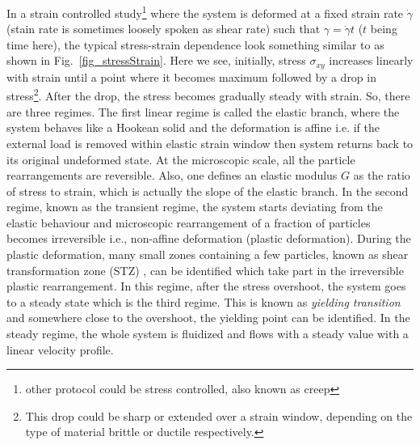     In a strain controlled study\footnote{other protocol could be stress controlled, also known as creep} where the system is deformed at a fixed strain rate $\dot{\gamma}$ (stain rate is sometimes loosely spoken as shear rate) such that $\gamma = \dot{\gamma} t$ ($t$ being time here), the typical stress-strain dependence look something similar to as shown in Fig.~\ref{fig_stressStrain}. Here we see, initially, stress $\sigma_{xy}$ increases linearly with strain until a point where it becomes maximum followed by a drop in stress\footnote{This drop could be sharp or extended over a strain window, depending on the type of material brittle or ductile respectively.}. After the drop, the stress becomes gradually steady with strain. So, there are three regimes. The first linear regime is called the elastic branch, where the system behaves like a Hookean solid and the deformation is affine i.e. if the external load is removed within elastic strain window then system returns back to its original undeformed state. At the microscopic scale, all the particle rearrangements are reversible. Also, one defines an elastic modulus $G$ as the ratio of stress to strain, which is actually the slope of the elastic branch.  In the second regime, known as the transient regime, the system starts deviating from the elastic behaviour and microscopic rearrangement of a fraction of particles becomes irreversible i.e., non-affine deformation (plastic deformation). During the plastic deformation, many small zones containing a few particles, known as shear transformation zone (STZ) \cite{falkLanger98}, can be identified which take part in the irreversible plastic rearrangement. In this regime, after the stress overshoot, the system goes to a steady state which is the third regime. This is known as {\em yielding transition} and somewhere close to the overshoot, the yielding point can be identified. In the steady regime, the whole system is fluidized and flows with a steady value with a linear velocity profile.
    
